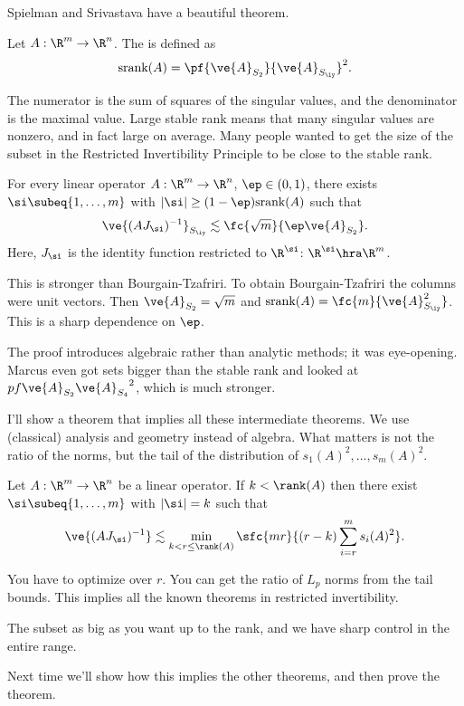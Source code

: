 Spielman and Srivastava have a beautiful theorem. %
\begin{df}
Let $A:\R^m \to \R^n$. 
The  is defined as
\[
\text{srank}(A)=\pf{\ve{A}_{S_2}}{\ve{A}_{S_\iy}}^2.
\]
\end{df}
The numerator is the sum of squares of the singular values, and the denominator is the maximal value. Large stable rank means that many singular values are nonzero, and in fact large on average. Many people wanted to get the size of the subset in the Restricted Invertibility Principle  
to be close to the stable rank.


\begin{thm}
For every linear operator $A:\R^m\to \R^n$, $\ep\in (0,1)$, 
there exists $\si\subeq \{1,\ldots, m\}$ with $|\si|\ge (1-\ep)\text{srank}(A)$ such that
\[
\ve{(AJ_\si)^{-1}}_{S_{\iy}} \lesssim \fc{\sqrt m}{\ep\ve{A}_{S_2}}.
\]
Here, $J_\si$ is the identity function restricted to $\R^{\si}$: $\R^{\si}\hra \R^m$. 
\end{thm}
This is stronger than Bourgain-Tzafriri. To obtain Bourgain-Tzafriri the columns were unit vectors. Then $\ve{A}_{S_2}=\sqrt m$  and $\text{srank}(A)=\fc{m}{\ve{A}^2_{S_{\iy}}}$. 
This is a sharp dependence on $\ep$.

The proof introduces algebraic rather than analytic methods; it was eye-opening. Marcus even got sets bigger than the stable rank and looked at $pf{\ve{A}_{S_2}}{\ve{A}_{S_4}}^2$, which is much stronger.

I'll show a theorem that implies all these intermediate theorems. We use (classical) analysis and geometry instead of algebra.
What matters is not the ratio of the norms, but the tail of the distribution of $s_1(A)^2,\ldots, s_m(A)^2$.
\begin{thm}
Let $A:\R^m\to \R^n$ be a linear operator. If $k<\rank(A)$  then there exist $\si\subeq \{1,\ldots, m\}$ with $|\si|=k$ such that 
\[
\ve{(AJ_\si)^{-1}} \lesssim \min_{k<r\le \rank(A)}\sfc{mr}{(r-k) \sum_{i=r}^m s_i(A)^2}.
\]
\end{thm}
You have to optimize over $r$. You can get the ratio of $L_p$ norms from the tail bounds. This implies all the known theorems in restricted invertibility.

The subset as big as you want up to the rank, and we have sharp control in the entire range.

Next time we'll show how this implies the other theorems, and then prove the theorem. %